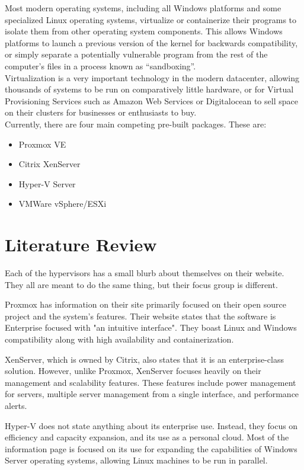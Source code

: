 \documentclass[12pt]{spieman}  %
\begin{document}
Most modern operating systems, including all Windows platforms and some specialized Linux operating systems, virtualize or containerize their programs to isolate them from other operating system components. This allows Windows platforms to launch a previous version of the kernel for backwards compatibility, or simply separate a potentially vulnerable program from the rest of  the computer’s files in a process known as “sandboxing”.\\

Virtualization is a very important technology in the modern datacenter, allowing thousands of systems to be run on comparatively little hardware, or for Virtual Provisioning Services such as Amazon Web Services or Digitalocean to sell space on their clusters for businesses or enthusiasts to buy.\\

Currently, there are four main competing pre-built packages. These are:
\begin{itemize}
\item Proxmox VE
\item Citrix XenServer
\item Hyper-V Server
\item VMWare vSphere/ESXi
\end{itemize}

\section{Literature Review}

Each of the hypervisors has a small blurb about themselves on their website. They all are meant to do the same thing, but their focus group is different.

Proxmox has information on their site primarily focused on their open source project and the system's features. Their website states that the software is Enterprise focused with "an intuitive interface"\cite{proxmoxweb}. They boast Linux and Windows compatibility along with high availability and containerization.

XenServer, which is owned by Citrix, also states that it is an enterprise-class solution. However, unlike Proxmox, XenServer focuses heavily on their management and scalability features. These features include power management for servers, multiple server management from a single interface, and performance alerts\cite{xenserverweb}.

Hyper-V does not state anything about its enterprise use. Instead, they focus on efficiency and capacity expansion, and its use as a personal cloud\cite{hypervweb}. Most of the information page is focused on its use for expanding the capabilities of Windows Server operating systems, allowing Linux machines to be run in parallel.
\end{document}
